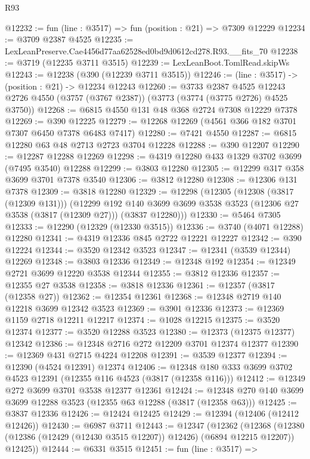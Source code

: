 \begin{lexlean}{R93}
\begin{coremodule}
@12232 := fun (line : @3517) => fun (position : @21) => @7309 @12229
@12234 := @3709 @2387 @4525
@12235 := LexLeanPreserve.Cae4456d77aa62528ed0bd9d0612cd278.R93.__fits_70
@12238 := @3719 (@12235 @3711 @3515)
@12239 := LexLeanBoot.TomlRead.skipWs
@12243 := @12238 (@390 (@12239 @3711 @3515))
@12246 := (line : @3517) -> (position : @21) -> @12234 @12243
@12260 := @3733
    @2387
    @4525
    @12243
    @2726
    @4550
    (@3757 (@3767 @2387))
    (@3773 (@3774 (@3775 @2726) @4525 @3750))
@12268 := @6815 @4550 @131 @48 @368 @2724 @7308 @12229 @7378
@12269 := @390 @12225
@12279 := @12268 @12269 (@4561 @366 @182 @3701 @7307 @6450 @7378 @6483 @7417)
@12280 := @7421 @4550
@12287 := @6815 @12280 @63 @48 @2713 @2723 @3704 @12228
@12288 := @390 @12207
@12290 := @12287 @12288 @12269
@12298 := @4319 @12280 @433 @1329 @3702 @3699 (@7495 @3540) @12288
@12299 := @3803 @12280
@12305 := @12299 @317 @358 @3699 @3701 @7378 @3540
@12306 := @3812 @12280
@12308 := @12306 @131 @7378
@12309 := @3818 @12280
@12329 := @12298
    (@12305
      (@12308 (@3817 (@12309 @131)))
      (@12299
        @192
        @140
        @3699
        @3699
        @3538
        @3523
        (@12306 @27 @3538 (@3817 (@12309 @27)))
        (@3837 @12280)))
@12330 := @5464 @7305
@12333 := @12290 (@12329 (@12330 @3515))
@12336 := @3740 (@4071 @12288) @12280
@12341 := @4319 @12336 @845 @2722 @12221 @12227
@12342 := @390 @12224
@12344 := @3520 @12342 @3523
@12347 := @12341 (@3539 @12344) @12269
@12348 := @3803 @12336
@12349 := @12348 @192
@12354 := @12349 @2721 @3699 @12220 @3538 @12344
@12355 := @3812 @12336
@12357 := @12355 @27 @3538
@12358 := @3818 @12336
@12361 := @12357 (@3817 (@12358 @27))
@12362 := @12354 @12361
@12368 := @12348 @2719 @140 @12218 @3699 @12342 @3523
@12369 := @3901 @12336
@12373 := @12369 @1159 @2718 @12211 @12217
@12374 := @1028 @12215
@12375 := @3520 @12374
@12377 := @3520 @12288 @3523
@12380 := @12373 (@12375 @12377) @12342
@12386 := @12348 @2716 @272 @12209 @3701 @12374 @12377
@12390 := @12369 @431 @2715 @4224 @12208
@12391 := @3539 @12377
@12394 := @12390 (@4524 @12391) @12374
@12406 := @12348 @180 @333 @3699 @3702 @4523 @12391 (@12355 @116 @4523 (@3817 (@12358 @116)))
@12412 := @12349 @272 @3699 @3701 @3538 @12377 @12361
@12424 := @12348 @270 @140 @3699 @3699 @12288 @3523 (@12355 @63 @12288 (@3817 (@12358 @63)))
@12425 := @3837 @12336
@12426 := @12424 @12425
@12429 := @12394 (@12406 (@12412 @12426))
@12430 := @6987 @3711
@12443 := @12347
    (@12362
      (@12368 (@12380 (@12386 (@12429 (@12430 @3515 @12207)) @12426) (@6894 @12215 @12207)) @12425))
@12444 := @6331 @3515
@12451 := fun (line : @3517) =>

\end{coremodule}
\end{lexlean}
